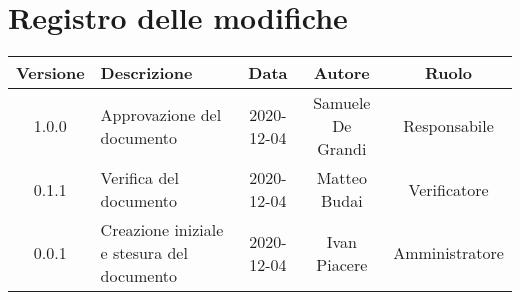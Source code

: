 \section*{Registro delle modifiche}

\begin{center}
	\begin{longtable}{|c|p{5cm}|c|c|c|}
	\hline
	\rowcolor{lighter-grayer}
	\textbf{Versione} & \textbf{Descrizione} & \textbf{Data} & \textbf{Autore} & \textbf{Ruolo} \\
	\hline
	\endfirsthead


	\hline
	1.0.0 & Approvazione del documento & 2020-12-04 & Samuele De Grandi & Responsabile \\
	\hline
	0.1.1 & Verifica del documento & 2020-12-04 & Matteo Budai & Verificatore \\
	\hline
	0.0.1 & Creazione iniziale e stesura del documento & 2020-12-04 & Ivan Piacere & Amministratore \\
	\hline
	\end{longtable}
\end{center}